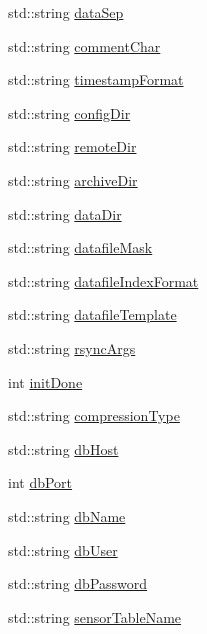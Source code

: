 \begin{DoxyCompactItemize}
\item 
std\-::string \hyperlink{classDAQDevice_ae8e11658c72f3a6468cc37f1e8cf08bb}{data\-Sep}
\item 
std\-::string \hyperlink{classDAQDevice_af34a3a4a6cc3b4a8c01ce42d495be6c2}{comment\-Char}
\item 
std\-::string \hyperlink{classDAQDevice_a35f89e6ada8acd69ce9b705633370345}{timestamp\-Format}
\item 
std\-::string \hyperlink{classDAQDevice_a1fcd353aea74e51801b36d5728f67e66}{config\-Dir}
\item 
std\-::string \hyperlink{classDAQDevice_a6df191f01fd268b0072e09ba2b76827f}{remote\-Dir}
\item 
std\-::string \hyperlink{classDAQDevice_a40eb0f06fac7ec90ed04b766b1f5df3c}{archive\-Dir}
\item 
std\-::string \hyperlink{classDAQDevice_ae99e0e25b09c03713caac3f9b2baaee8}{data\-Dir}
\item 
std\-::string \hyperlink{classDAQDevice_ad3cde27a8f45ea3af4495a9d366c31c3}{datafile\-Mask}
\item 
std\-::string \hyperlink{classDAQDevice_a3d221f2cd6d5d903cbaa8c80abe495de}{datafile\-Index\-Format}
\item 
std\-::string \hyperlink{classDAQDevice_a551a005ad3f98c83a2b8b38bc3634007}{datafile\-Template}
\item 
std\-::string \hyperlink{classDAQDevice_ae6db34954e8c3723feba1d32a7643095}{rsync\-Args}
\item 
int \hyperlink{classDAQDevice_ad0a7f34f8a98c28fa5660714c048e657}{init\-Done}
\item 
std\-::string \hyperlink{classDAQDevice_ac06e9cd93e95a3c4e33970edb79f9148}{compression\-Type}
\item 
std\-::string \hyperlink{classDAQDevice_ad85b8bb5afbe0a9c3cd75e7ee9ef83ee}{db\-Host}
\item 
int \hyperlink{classDAQDevice_a275b8a01d1219d64a64a2536038039a4}{db\-Port}
\item 
std\-::string \hyperlink{classDAQDevice_afb3d256eedb538510939b8c40e26a968}{db\-Name}
\item 
std\-::string \hyperlink{classDAQDevice_a1cecb55a4edaf4299411f650c7410e5e}{db\-User}
\item 
std\-::string \hyperlink{classDAQDevice_ab02618ceb308d39d365bc0b394914b69}{db\-Password}
\item 
std\-::string \hyperlink{classDAQDevice_a4140887251923bc9715a23fb63849785}{sensor\-Table\-Name}
\item 

\end{DoxyCompactItemize}
